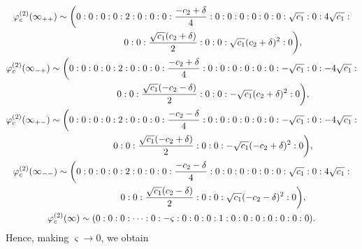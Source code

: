 \documentclass[pdftex]{sigma}
\numberwithin{equation}{section}
\begin{document}
\begin{gather*}
 \varphi_c^{(2)}(\infty_{++}) \sim
 \biggl(0:0:0:0:2:0:0:0:\frac{-c_2+\delta}{4}:0:0:0:0:0:0: \sqrt{c_1}:0:4\sqrt{c_1}:\\ \hphantom{\varphi_c^{(2)}(\infty_{++}) \sim\biggl(}{}
 0:0:\frac{\sqrt{c_1}(c_2+\delta)}{2}:0:0:\sqrt{c_1}(c_2+\delta)^2:0\biggr),\\
 \varphi_c^{(2)}(\infty_{-+})\sim
 \biggl(0:0:0:0:2:0:0:0:\frac{-c_2+\delta}{4}:0:0:0:0:0:0: -\sqrt{c_1}:0:-4\sqrt{c_1}:\\ \hphantom{\varphi_c^{(2)}(\infty_{-+})\sim\biggl(}{}
 0:0:\frac{\sqrt{c_1}(-c_2-\delta)}{2}:0:0:-\sqrt{c_1}(c_2+\delta)^2:0\biggr),\\
 \varphi_c^{(2)}(\infty_{+-})\sim
 \biggl(0:0:0:0:2:0:0:0:\frac{-c_2-\delta}{4}:0:0:0:0:0:0: -\sqrt{c_1}:0:-4\sqrt{c_1}:\\ \hphantom{\varphi_c^{(2)}(\infty_{+-})\sim\biggl(}{}
 0:0:\frac{\sqrt{c_1}(-c_2+\delta)}{2}:0:0:-\sqrt{c_1}(-c_2+\delta)^2:0\biggr),\\
 \varphi_c^{(2)}(\infty_{--})\sim
 \biggl(0:0:0:0:2:0:0:0:\frac{-c_2-\delta}{4}:0:0:0:0:0:0: \sqrt{c_1}:0:4\sqrt{c_1}:\\ \hphantom{\varphi_c^{(2)}(\infty_{--})\sim\biggl(}{}
 0:0:\frac{\sqrt{c_1}(c_2-\delta)}{2}:0:0:\sqrt{c_1}(-c_2-\delta)^2:0\biggr),\\
 \varphi_c^{(2)}(\infty) \sim (0:0:0:\dots:0:-\varsigma:0:0:0:1:0:0:0:0:0:0:0).
\end{gather*}
Hence, making $\varsigma \rightarrow 0$, we obtain
\end{document}
